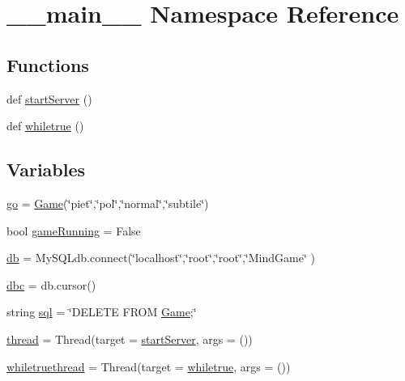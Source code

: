\hypertarget{namespace____main____}{}\section{\+\_\+\+\_\+main\+\_\+\+\_\+ Namespace Reference}
\label{namespace____main____}
\subsection*{Functions}
\begin{DoxyCompactItemize}
\item 
def \hyperlink{namespace____main_____a2b75075b3fab588340f99971f29de8da}{start\+Server} ()
\item 
def \hyperlink{namespace____main_____a5cd663b7efff8164ad13f39d2f577eee}{whiletrue} ()
\end{DoxyCompactItemize}
\subsection*{Variables}
\begin{DoxyCompactItemize}
\item 
\hyperlink{namespace____main_____a1406f37190e825427440bc020919218a}{go} = \hyperlink{classgame_1_1game_1_1_game}{Game}(\char`\"{}piet\char`\"{},\char`\"{}pol\char`\"{},\char`\"{}normal\char`\"{},\char`\"{}subtile\char`\"{})
\item 
bool \hyperlink{namespace____main_____aaa52a27abaaf72231a84c99f2bfa4283}{game\+Running} = False
\item 
\hyperlink{namespace____main_____a89a7f6028a19c3dc081cc5f16eb53891}{db} = My\+S\+Q\+Ldb.\+connect(\char`\"{}localhost\char`\"{},\char`\"{}root\char`\"{},\char`\"{}root\char`\"{},\char`\"{}Mind\+Game\char`\"{} )
\item 
\hyperlink{namespace____main_____af60395b62cdfc4e22c9bee4739bcc464}{dbc} = db.\+cursor()
\item 
string \hyperlink{namespace____main_____acf77f6f6ad1fd09466587857fd4b2e7e}{sql} = \char`\"{}D\+E\+L\+E\+TE F\+R\+OM \hyperlink{classgame_1_1game_1_1_game}{Game};\char`\"{}
\item 
\hyperlink{namespace____main_____ae3f5dd704a78b1b22fbf6672452aff3e}{thread} = Thread(target = \hyperlink{namespace____main_____a2b75075b3fab588340f99971f29de8da}{start\+Server}, args = ())
\item 
\hyperlink{namespace____main_____a53ebc1b671bc860d557e274c6f7db716}{whiletruethread} = Thread(target = \hyperlink{namespace____main_____a5cd663b7efff8164ad13f39d2f577eee}{whiletrue}, args = ())
\end{DoxyCompactItemize}


